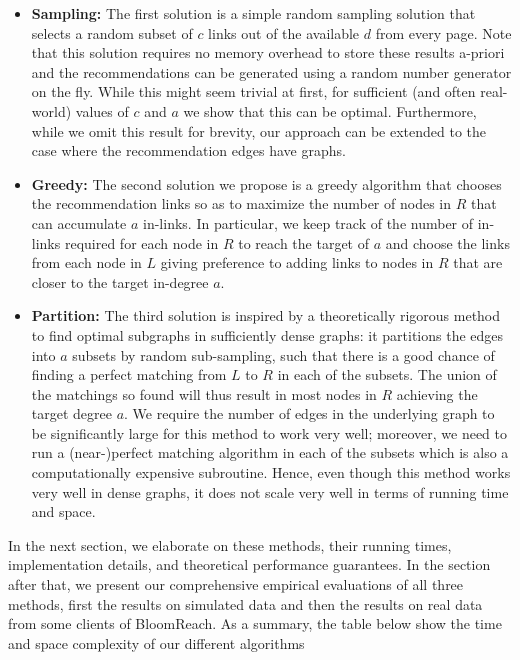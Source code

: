 \begin{itemize}

\item {\bf Sampling:} The first solution is a simple random sampling
  solution that selects a random subset of $c$ links out of the
  available $d$ from every page. Note that this solution requires no
  memory overhead to store these results a-priori and the
  recommendations can be generated using a random number generator on
  the fly. While this might seem trivial at first, for sufficient (and
  often real-world) values of $c$ and $a$ we show that this can be
  optimal. Furthermore, while we omit this result for brevity, our 
  approach can be extended to the case where the recommendation edges
  have graphs.

\item {\bf Greedy:} The second solution we propose is a greedy
  algorithm that chooses the recommendation links so as to maximize
  the number of nodes in $R$ that can accumulate $a$ in-links. In
  particular, we keep track of the number of in-links required for
  each node in $R$ to reach the target of $a$ and choose the links
  from each node in $L$ giving preference to adding links to nodes in
  $R$ that are closer to the target in-degree $a$.

\item {\bf Partition:} The third solution is inspired by a
  theoretically rigorous method to find optimal subgraphs in
  sufficiently dense graphs: it partitions the edges into $a$ subsets
  by random sub-sampling, such that there is a good chance of finding
  a perfect matching from $L$ to $R$ in each of the subsets. The union
  of the matchings so found will thus result in most nodes in $R$
  achieving the target degree $a$. We require the number of edges in
  the underlying graph to be significantly large for this method to
  work very well; moreover, we need to run a (near-)perfect matching
  algorithm in each of the subsets which is also a computationally
  expensive subroutine. Hence, even though this method works very well
  in dense graphs, it does not scale very well in terms of running
  time and space.
\end{itemize}

In the next section, we elaborate on these methods, their running
times, implementation details, and theoretical performance
guarantees. In the section after that, we present our comprehensive
empirical evaluations of all three methods, first the results on
simulated data and then the results on real data from some clients of
BloomReach. As a summary, the table below show the time and space complexity
of our different algorithms

